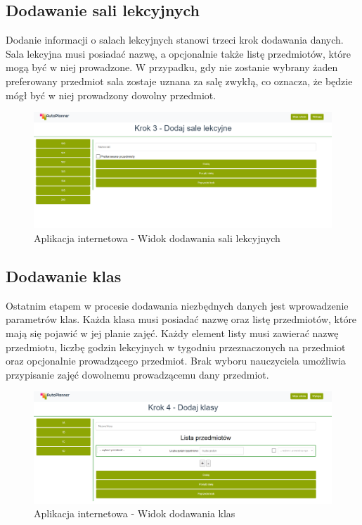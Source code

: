 \subsection{Dodawanie sali lekcyjnych}
Dodanie informacji o salach lekcyjnych stanowi trzeci krok dodawania danych. Sala lekcyjna musi posiadać nazwę, a opcjonalnie także listę przedmiotów, które mogą być w  niej prowadzone. W przypadku, gdy nie zostanie wybrany żaden preferowany przedmiot sala zostaje uznana za salę zwykłą, co oznacza, że będzie mógł być w niej prowadzony dowolny przedmiot.
\begin{figure}[!ht]
\centering\includegraphics[width=\textwidth]{figures/classroom}
\caption{Aplikacja internetowa - Widok dodawania sali lekcyjnych}\label{rys:classroom}
\end{figure}
\subsection{Dodawanie klas}
Ostatnim etapem w procesie dodawania niezbędnych danych jest wprowadzenie parametrów klas. Każda klasa musi posiadać nazwę oraz listę przedmiotów, które mają się pojawić w jej planie zajęć. Każdy element listy musi zawierać nazwę przedmiotu, liczbę godzin lekcyjnych w tygodniu przeznaczonych na przedmiot oraz opcjonalnie prowadzącego przedmiot. Brak wyboru nauczyciela umożliwia przypisanie zajęć dowolnemu prowadzącemu dany przedmiot.
\begin{figure}[!ht]
\centering\includegraphics[width=\textwidth]{figures/class}
\caption{Aplikacja internetowa - Widok dodawania klas}\label{rys:class}
\end{figure}
